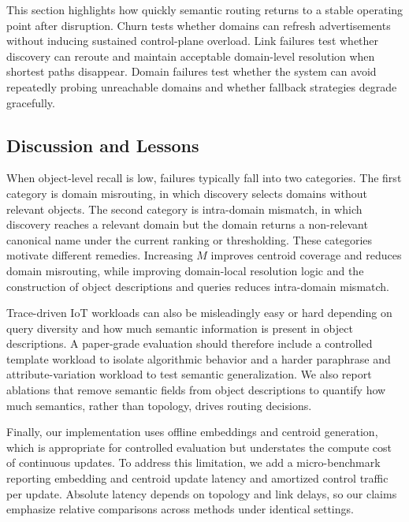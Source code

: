 \documentclass[journal]{IEEEtran}
\begin{document}
This section highlights how quickly semantic routing returns to a stable operating point after disruption.
Churn tests whether domains can refresh advertisements without inducing sustained control-plane overload.
Link failures test whether discovery can reroute and maintain acceptable domain-level resolution when shortest paths disappear.
Domain failures test whether the system can avoid repeatedly probing unreachable domains and whether fallback strategies degrade gracefully.

\subsection{Discussion and Lessons}
\label{sec:eval_discussion}

When object-level recall is low, failures typically fall into two categories.
The first category is domain misrouting, in which discovery selects domains without relevant objects.
The second category is intra-domain mismatch, in which discovery reaches a relevant domain but the domain returns a non-relevant canonical name under the current ranking or thresholding.
These categories motivate different remedies.
Increasing $M$ improves centroid coverage and reduces domain misrouting, while improving domain-local resolution logic and the construction of object descriptions and queries reduces intra-domain mismatch.

Trace-driven IoT workloads can also be misleadingly easy or hard depending on query diversity and how much semantic information is present in object descriptions.
A paper-grade evaluation should therefore include a controlled template workload to isolate algorithmic behavior and a harder paraphrase and attribute-variation workload to test semantic generalization.
We also report ablations that remove semantic fields from object descriptions to quantify how much semantics, rather than topology, drives routing decisions.

Finally, our implementation uses offline embeddings and centroid generation, which is appropriate for controlled evaluation but understates the compute cost of continuous updates.
To address this limitation, we add a micro-benchmark reporting embedding and centroid update latency and amortized control traffic per update.
Absolute latency depends on topology and link delays, so our claims emphasize relative comparisons across methods under identical settings.
\end{document}
